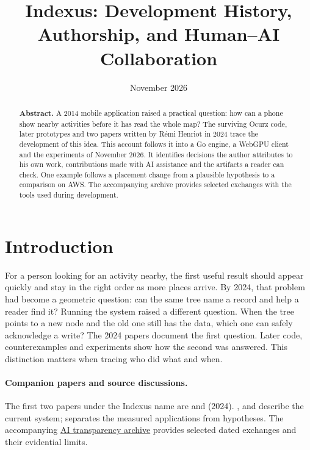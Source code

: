 \documentclass[11pt]{article}
\begin{document}
\title{Indexus: Development History, Authorship, and Human--AI Collaboration}
\author{\ixbyline}
\date{November 2026}
\maketitle

\begin{abstract}
\noindent \textbf{Abstract. }A 2014 mobile application raised a practical question: how can a phone show nearby activities before it has read the whole map? The surviving Ocurz code, later prototypes and two papers written by Rémi Henriot in 2024 trace the development of this idea. This account follows it into a Go engine, a WebGPU client and the experiments of November 2026. It identifies decisions the author attributes to his own work, contributions made with AI assistance and the artifacts a reader can check. One example follows a placement change from a plausible hypothesis to a comparison on AWS. The accompanying archive provides selected exchanges with the tools used during development.

\vspace{1em}\end{abstract}

\section{Introduction}
For a person looking for an activity nearby, the first useful result should appear quickly and stay in the right order as more places arrive. By 2024, that problem had become a geometric question: can the same tree name a record and help a reader find it? Running the system raised a different question. When the tree points to a new node and the old one still has the data, which one can safely acknowledge a write? The 2024 papers document the first question. Later code, counterexamples and experiments show how the second was answered. This distinction matters when tracing who did what and when.

\paragraph{Companion papers and source discussions.}
The first two papers under the Indexus name are
 and  (2024).
,  and  describe the current
system;  separates the measured applications from hypotheses.
The accompanying \href{https://github.com/indexus/papers/tree/main/ai-transparency}{AI transparency archive}
provides selected dated exchanges and their evidential limits.
\end{document}
